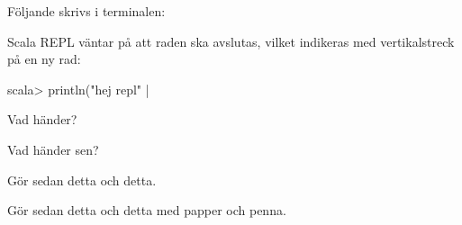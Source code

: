 

\BasicTasks %

\Task 

\Subtask Följande skrivs i terminalen: 

\Subtask Scala REPL väntar på att raden ska avslutas, vilket indikeras med vertikalstreck \code{|} på en ny rad:
\begin{REPL}
scala> println("hej repl"
     | 
\end{REPL}

\Task  

\Subtask Vad händer?

\Subtask Vad händer sen?

\Task Gör sedan detta och detta. 

\TaskPen Gör sedan detta och detta med papper och penna.

\ExtraTasks %
\lipsum[2]


\AdvancedTasks %
\lipsum[2]